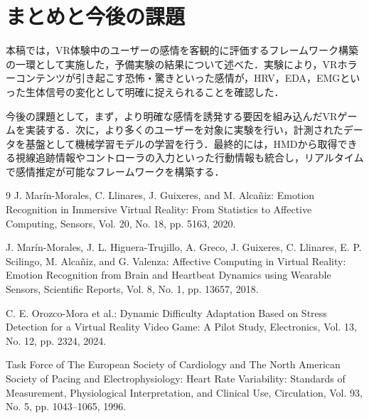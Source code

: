 \documentclass[paper=a4paper,fontsize=10pt,jafontscale=0.925,twocolumn]{jlreq}
\begin{document}
\section{まとめと今後の課題}
本稿では，VR体験中のユーザーの感情を客観的に評価するフレームワーク構築の一環として実施した，予備実験の結果について述べた．実験により，VRホラーコンテンツが引き起こす恐怖・驚きといった感情が，HRV，EDA，EMGといった生体信号の変化として明確に捉えられることを確認した．

今後の課題として，まず，より明確な感情を誘発する要因を組み込んだVRゲームを実装する．次に，より多くのユーザーを対象に実験を行い，計測されたデータを基盤として機械学習モデルの学習を行う．最終的には，HMDから取得できる視線追跡情報やコントローラの入力といった行動情報も統合し，リアルタイムで感情推定が可能なフレームワークを構築する．

\begin{thebibliography}{9}
J. Marín-Morales, C. Llinares, J. Guixeres, and M. Alcañiz: Emotion Recognition in Immersive Virtual Reality: From Statistics to Affective Computing, Sensors, Vol. 20, No. 18, pp. 5163, 2020.

J. Marín-Morales, J. L. Higuera-Trujillo, A. Greco, J. Guixeres, C. Llinares, E. P. Scilingo, M. Alcañiz, and G. Valenza: Affective Computing in Virtual Reality: Emotion Recognition from Brain and Heartbeat Dynamics using Wearable Sensors, Scientific Reports, Vol. 8, No. 1, pp. 13657, 2018.

C. E. Orozco-Mora et al.: Dynamic Difficulty Adaptation Based on Stress Detection for a Virtual Reality Video Game: A Pilot Study, Electronics, Vol. 13, No. 12, pp. 2324, 2024.

Task Force of The European Society of Cardiology and The North American Society of Pacing and Electrophysiology: Heart Rate Variability: Standards of Measurement, Physiological Interpretation, and Clinical Use, Circulation, Vol. 93, No. 5, pp. 1043–1065, 1996.
\end{thebibliography}
\end{document}
